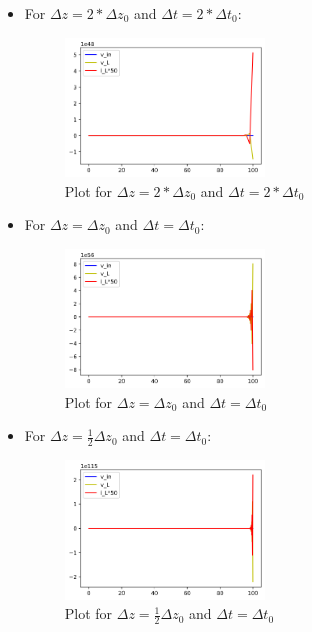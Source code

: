 \documentclass{article}
\begin{document}
        \begin{itemize}
            \item[] For $\Delta z = 2 * \Delta z_0$ and $\Delta t = 2 * \Delta t_0$:
            
                \begin{figure}[H]
                    \centering
                    \includegraphics[width=0.5\textwidth]{img/2z0_2t0.png}
                    \caption{Plot for $\Delta z = 2 * \Delta z_0$ and $\Delta t = 2 * \Delta t_0$}
                    \label{fig:2z0-2t0}
                \end{figure}

            \item[] For $\Delta z = \Delta z_0$ and $\Delta t = \Delta t_0$: 
            
                \begin{figure}[H]
                    \centering
                    \includegraphics[width=0.5\textwidth]{img/z0_t0.png}
                    \caption{Plot for $\Delta z = \Delta z_0$ and $\Delta t = \Delta t_0$}
                    \label{fig:z0-t0}
                \end{figure}

            \item[] For $\Delta z = \frac{1}{2}\Delta z_0$ and $\Delta t = \Delta t_0$: 
            
                \begin{figure}[H]
                    \centering
                    \includegraphics[width=0.5\textwidth]{img/z02_t0.png}
                    \caption{Plot for $\Delta z = \frac{1}{2}\Delta z_0$ and $\Delta t = \Delta t_0$}
                    \label{fig:z02-t0}
                \end{figure}


\end{itemize}
\end{document}
